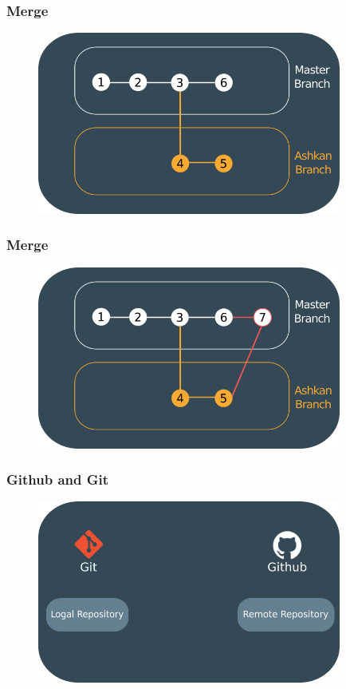 \documentclass{beamer}
\begin{document}
	\begin{frame}
		\frametitle{Merge}
		\begin{figure}[htbp]
			\centering
			\includegraphics[width=10cm]{howgitwork14}
		\end{figure}
	\end{frame}
	
	\begin{frame}
		\frametitle{Merge}
		\begin{figure}[htbp]
			\centering
			\includegraphics[width=10cm]{howgitwork15}
		\end{figure}
	\end{frame}

	\begin{frame}
		\frametitle{Github and Git}
		\begin{figure}[htbp]
			\centering
			\includegraphics[width=10cm]{githubgit1}
		\end{figure}
	\end{frame}
	
\end{document}
